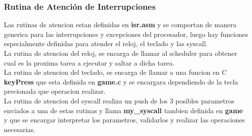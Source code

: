 \subsubsection{Rutina de Atención de Interrupciones}

Las rutinas de atencion estan definidas en \textbf{isr.asm} y se comportan de manera generica para las interrupciones y excepciones del procesador, luego hay funciones especialmente definidas para atender el reloj, el teclado y las syscall.\\
La rutina de atencion del reloj, se encarga de llamar al scheduler para obtener cual es la proxima tarea a ejecutar y saltar a dicha tarea.\\
La rutina de atencion del teclado, se encarga de llamar a una funcion en C \textbf{keyPress} que esta definida en \textbf{game.c} y se encargara dependiendo de la tecla precionada que operacion realizar.\\
La rutina de atencion del syscall realiza un push de los 3 posibles parametros enviados a una de estas rutinas y llama \textbf{my_syscall} tambien definida en \textbf{game} y que se encargar interpretar los parametros, validarlos y realizar las operaciones necesarias.